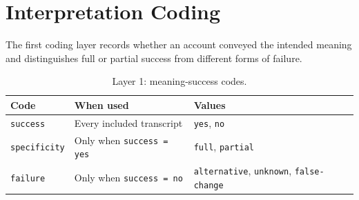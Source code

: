 \documentclass[
english,                 %
bibtex,                  %
includeExtraAbstracts, %
]{kththesis}
\newenvironment{evidenceblock}{\par\addvspace{6pt}\noindent\begin{minipage}{\linewidth}}{\end{minipage}\par\addvspace{6pt}}
\numberwithin{listing}{chapter}
\begin{document}
\section{Interpretation Coding}
\label{app:interpretation-coding}

\begin{evidenceblock}
\normalsize
The first coding layer records whether an account conveyed the intended meaning and distinguishes full or partial success from different forms of failure.

\begin{table}[H]
\centering
\scriptsize
\caption[Layer 1: meaning-success codes]{Layer 1: meaning-success codes.}
\label{tab:rq3-meaning-codebook}
\begin{tabularx}{\textwidth}{@{}l >{\raggedright\arraybackslash}X >{\raggedright\arraybackslash}X@{}}
\toprule
Code & When used & Values \\
\midrule
\texttt{success} & Every included transcript & \texttt{yes}, \texttt{no} \\
\texttt{specificity} & Only when \texttt{success = yes} & \texttt{full}, \texttt{partial} \\
\texttt{failure} & Only when \texttt{success = no} & \texttt{alternative}, \texttt{unknown}, \texttt{false-change} \\
\bottomrule
\end{tabularx}
\end{table}
\end{evidenceblock}
\end{document}
